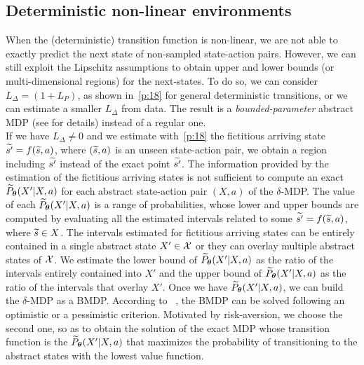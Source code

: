 \subsection{Deterministic non-linear environments}
When the (deterministic) transition function is non-linear, we are not able to exactly predict the next state of non-sampled state-action pairs. However, we can still exploit the Lipschitz assumptions to obtain upper and lower bounds (or multi-dimensional regions) for the next-states. To do so, we can consider $L_{\Delta} = \left(1 + L_{P} \right)$, as shown in~\eqref{p:18} for general deterministic transitions, or we can estimate a smaller $L_{\Delta}$ from data.
The result is a \emph{bounded-parameter} abstract \ac{MDP} (see  for details) instead of a regular one.\\
\newline
If we have $L_{\Delta} \neq 0$ and we estimate with~\eqref{p:18} the fictitious arriving state $\widetilde{s'} = f(\widetilde{s}, a)$, where $(\widetilde{s},a)$ is an unseen state-action pair, we obtain a region including $\widetilde{s'}$ instead of the exact point $\widetilde{s'}$. The information provided by the estimation of the fictitious arriving states is not sufficient to compute an exact $\widetilde{P}_{\boldsymbol{\theta}}(X'|X,a)$ for each abstract state-action pair $(X,a)$ of the $\delta$-\ac{MDP}. The value of each $\widetilde{P}_{\boldsymbol{\theta}}(X'|X,a)$ is a range of probabilities, whose lower and upper bounds are computed by evaluating all the estimated intervals related to some $\widetilde{s'}=f(\widetilde{s}, a)$, where $\widetilde{s} \in X$. The intervals estimated for fictitious arriving states can be entirely contained in a single abstract state $X' \in \mathcal{X}$ or they can overlay multiple abstract states of $\mathcal{X}$. We estimate the lower bound of $\widetilde{P}_{\boldsymbol{\theta}}(X'|X,a)$ as the ratio of the intervals entirely contained into $X'$ and the upper bound of $\widetilde{P}_{\boldsymbol{\theta}}(X'|X,a)$ as the ratio of the intervals that overlay $X'$. Once we have $\widetilde{P}_{\boldsymbol{\theta}}(X'|X,a)$, we can build the $\delta$-\ac{MDP} as a \ac{BMDP}. According to ~\citep{givan2000bounded}, the \ac{BMDP} can be solved following an optimistic or a pessimistic criterion. Motivated by risk-aversion, we choose the second one, so as to obtain the solution of the exact \ac{MDP} whose transition function is the $\widetilde{P}_{\boldsymbol{\theta}}(X'|X,a)$ that maximizes the probability of transitioning to the abstract states with the lowest value function.

